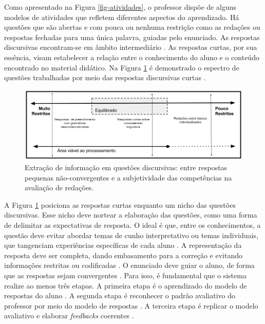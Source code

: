 Como apresentado na Figura \ref{fig-atividades}, o professor dispõe de alguns modelos de atividades que refletem diferentes aspectos do aprendizado. Há questões que são abertas e com pouca ou nenhuma restrição como as redações \cite{almeida-junior2017} ou respostas fechadas para uma única palavra, guiadas pelo enunciado. As respostas discursivas encontram-se em âmbito intermediário \cite{bailey2008}. As respostas curtas, por sua essência, visam estabelecer a relação entre o conhecimento do aluno e o conteúdo encontrado no material didático. Na Figura \ref{fig-SAG-concepts} é demonstrado o espectro de questões trabalhadas por meio das respostas discursivas curtas \cite{spalenza2017}.

\begin{figure}[!h]
\centering
\includegraphics[width=\textwidth]{figuras/aprendizadoSAG}
\caption{Extração de informação em questões discursivas: entre respostas pequenas não-convergentes e a subjetividade das competências na avaliação de redações.}
\label{fig-SAG-concepts}
\end{figure}

A Figura \ref{fig-SAG-concepts} posiciona as respostas curtas enquanto um nicho das questões discursivas. Esse nicho deve nortear a elaboração das questões, como uma forma de delimitar as expectativas de resposta. O ideal é que, entre os conhecimentos, a questão deve evitar abordar temas de cunho interpretativo ou temas individuais, que tangenciam experiências específicas de cada aluno \cite{siddiqi2008}. A representação da resposta deve ser completa, dando embasamento para a correção e evitando informações restritas ou codificadas \cite{ding2020}. O enunciado deve guiar o aluno, de forma que as respostas sejam convergentes \cite{suzen2020, filighera2020}. Para isso, é fundamental que o sistema realize ao menos três etapas. A primeira etapa é o aprendizado do modelo de respostas do aluno \cite{ramachandran2015b}. A segunda etapa é reconhecer o padrão avaliativo do professor por meio do modelo de respostas \cite{funayama2020}. A terceira etapa é replicar o modelo avaliativo e elaborar \textit{feedbacks} coerentes \cite{fowler2021}.


